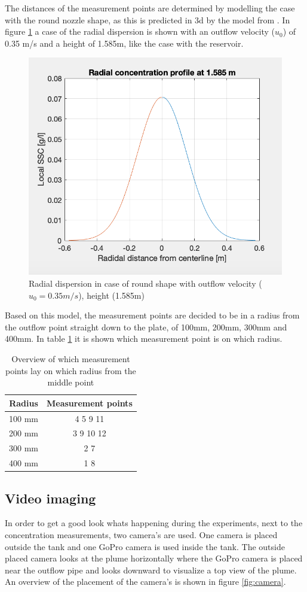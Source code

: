 \noindent The distances of the measurement points are determined by modelling the case with the round nozzle shape, as this is predicted in 3d by the model from \cite{Lee+}. In figure \ref{fig:Round_Lee} a case of the radial dispersion is shown with an outflow velocity ($u_0$) of 0.35 m/s and a height of 1.585m, like the case with the reservoir.


\begin{figure}[ht!]
    \centering
    \includegraphics[width=0.3\linewidth]{Images/Round_35.png}
    \caption{Radial dispersion in case of round shape with outflow velocity ($u_0 = 0.35 m/s$), height (1.585m)}
    \label{fig:Round_Lee}
\end{figure}

\noindent Based on this model, the measurement points are decided to be in a radius from the outflow point straight down to the plate, of 100mm, 200mm, 300mm and 400mm. In table \ref{tab:measurementpoints} it is shown which measurement point is on which radius.

\begin{table}[ht!]
\centering
\begin{tabular}{|c|c|}
\hline
\textbf{Radius} & \textbf{Measurement points} \\ \hline
100 mm & 4 5 9 11 \\ \hline
200 mm & 3 9 10 12 \\ \hline
300 mm & 2 7 \\ \hline
400 mm & 1 8 \\ \hline
\end{tabular}
\caption{Overview of which measurement points lay on which radius from the middle point}
\label{tab:measurementpoints}
\end{table}



%







\newpage
\subsection{Video imaging}
In order to get a good look whats happening during the experiments, next to the concentration measurements, two camera's are used. One camera is placed outside the tank and one GoPro camera is used inside the tank. The outside placed camera looks at the plume horizontally where the GoPro camera is placed near the outflow pipe and looks downward to visualize a top view of the plume. An overview of the placement of the camera's is shown in figure \ref{fig:camera}.

